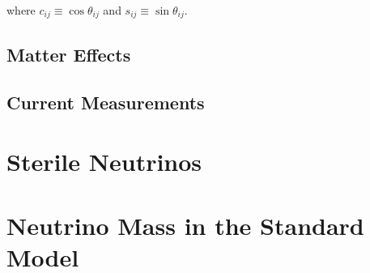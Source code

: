 \n where $c_{ij} \equiv \cos\theta_{ij}$ and $s_{ij} \equiv \sin\theta_{ij}$.

\subsection{Matter Effects}
\label{sec:TheoryMatter}

\subsection{Current Measurements}
\label{sec:BestMeasures}

\section{Sterile Neutrinos}
\label{sec:Theory3+1}

\section{Neutrino Mass in the Standard Model}
